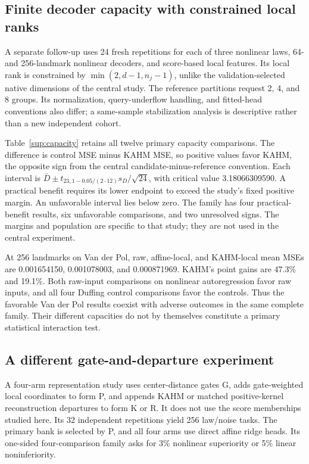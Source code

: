 \subsection{Finite decoder capacity with constrained local ranks}
A separate follow-up uses 24 fresh repetitions for each of three nonlinear laws, 64- and 256-landmark nonlinear decoders, and score-based local features. Its local rank is constrained by $\min(2,d-1,n_j-1)$, unlike the validation-selected native dimensions of the central study. The reference partitions request 2, 4, and 8 groups. Its normalization, query-underflow handling, and fitted-head conventions also differ; a same-sample stabilization analysis is descriptive rather than a new independent cohort.

Table~\ref{sup:capacity} retains all twelve primary capacity comparisons. The difference is control MSE minus KAHM MSE, so positive values favor KAHM, the opposite sign from the central candidate-minus-reference convention. Each interval is $\bar D\pm t_{23,1-0.05/(2\cdot12)}s_D/\sqrt{24}$, with critical value 3.18066309590. A practical benefit requires its lower endpoint to exceed the study's fixed positive margin. An unfavorable interval lies below zero. The family has four practical-benefit results, six unfavorable comparisons, and two unresolved signs. The margins and population are specific to that study; they are not used in the central experiment.

At 256 landmarks on Van der Pol, raw, affine-local, and KAHM-local mean MSEs are 0.001654150, 0.001078003, and 0.000871969. KAHM's point gains are 47.3\% and 19.1\%. Both raw-input comparisons on nonlinear autoregression favor raw inputs, and all four Duffing control comparisons favor the controls. Thus the favorable Van der Pol results coexist with adverse outcomes in the same complete family. Their different capacities do not by themselves constitute a primary statistical interaction test.

\begin{table}[htbp]\centering\small\setlength{\tabcolsep}{3pt}
\caption{Complete 24-repetition capacity family. Improvement, interval endpoints, and margins are multiplied by $10^3$. Positive improvement favors KAHM-local. These are MSEs from a different procedure, not the central SMSE estimand.}\label{sup:capacity}

\end{table}
\FloatBarrier

\subsection{A different gate-and-departure experiment}
A four-arm representation study uses center-distance gates G, adds gate-weighted local coordinates to form P, and appends KAHM or matched positive-kernel reconstruction departures to form K or R. It does not use the score memberships studied here. Its 32 independent repetitions yield 256 law/noise tasks. The primary bank is selected by P, and all four arms use direct affine ridge heads. Its one-sided four-comparison family asks for 3\% nonlinear superiority or 5\% linear noninferiority.

